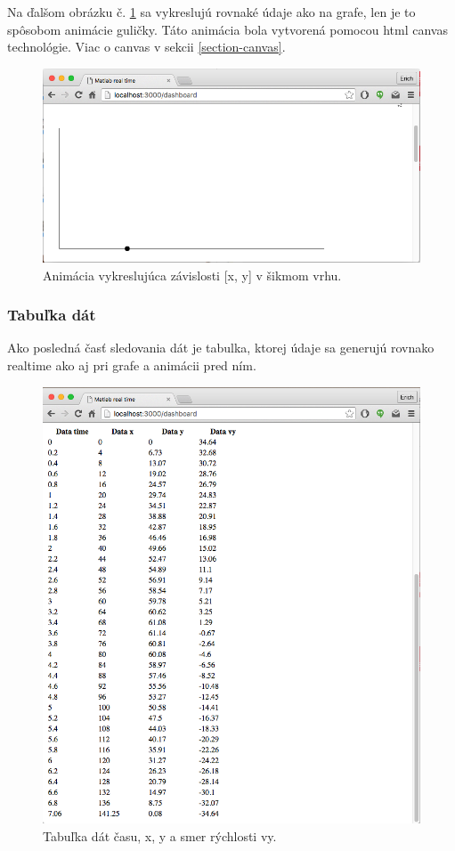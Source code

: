 Na ďalšom obrázku č. \ref{img-angular-canvas} sa vykreslujú rovnaké údaje ako na grafe, len je to spôsobom animácie guličky. Táto animácia bola vytvorená pomocou html canvas technológie. Viac o canvas v sekcii \ref{section-canvas}.

\begin{figure}[H]
  \centering
  \includegraphics[scale=0.5]{img/code/angular-canvas.png}
  \caption{Animácia vykreslujúca závislosti [x, y] v šikmom vrhu.}
  \label{img-angular-canvas}
\end{figure}

\subsubsection{Tabuľka dát}

Ako posledná časť sledovania dát je tabulka, ktorej údaje sa generujú rovnako realtime ako aj pri grafe a animácii pred ním.

\begin{figure}[H]
  \centering
  \includegraphics[scale=0.5]{img/code/angular-table.png}
  \caption{Tabuľka dát času, x, y a smer rýchlosti vy.}
  \label{img-angular-table}
\end{figure}


